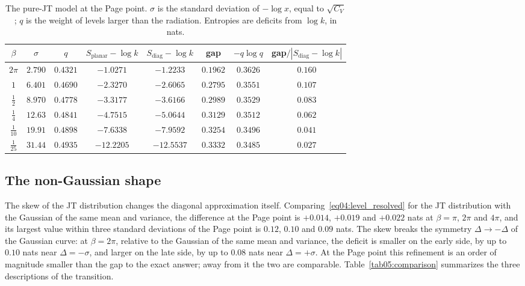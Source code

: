 \documentclass[11pt,letterpaper]{article}
\theoremstyle{plain}
\theoremstyle{definition}
\theoremstyle{remark}
\begin{document}
\begin{table}[htbp]
\centering
\caption{The pure-JT model at the Page point. $\sigma$ is the standard deviation of $-\log x$, equal to $\sqrt{C_V}$; $q$ is the weight of levels larger than the radiation. Entropies are deficits from $\log k$, in nats.}
\label{tab05:jt}
\begin{tabular}{cccccccc}
\toprule
$\beta$ & $\sigma$ & $q$ & $S_{\mathrm{planar}} - \log k$ & $S_{\mathrm{diag}} - \log k$ & gap & $-q\log q$ & gap$/|S_{\mathrm{diag}} - \log k|$ \\
\midrule
$2\pi$ & $2.790$ & $0.4321$ & $-1.0271$ & $-1.2233$ & $0.1962$ & $0.3626$ & $0.160$ \\
$1$ & $6.401$ & $0.4690$ & $-2.3270$ & $-2.6065$ & $0.2795$ & $0.3551$ & $0.107$ \\
$\tfrac12$ & $8.970$ & $0.4778$ & $-3.3177$ & $-3.6166$ & $0.2989$ & $0.3529$ & $0.083$ \\
$\tfrac14$ & $12.63$ & $0.4841$ & $-4.7515$ & $-5.0644$ & $0.3129$ & $0.3512$ & $0.062$ \\
$\tfrac1{10}$ & $19.91$ & $0.4898$ & $-7.6338$ & $-7.9592$ & $0.3254$ & $0.3496$ & $0.041$ \\
$\tfrac1{25}$ & $31.44$ & $0.4935$ & $-12.2205$ & $-12.5537$ & $0.3332$ & $0.3485$ & $0.027$ \\
\bottomrule
\end{tabular}
\end{table}

\subsection{The non-Gaussian shape}
\label{subsec05:three_layer}

The skew of the JT distribution changes the diagonal approximation itself. Comparing~\eqref{eq04:level_resolved} for the JT distribution with the Gaussian of the same mean and variance, the difference at the Page point is $+0.014$, $+0.019$ and $+0.022$ nats at $\beta = \pi$, $2\pi$ and $4\pi$, and its largest value within three standard deviations of the Page point is $0.12$, $0.10$ and $0.09$ nats. The skew breaks the symmetry $\Delta \to -\Delta$ of the Gaussian curve: at $\beta = 2\pi$, relative to the Gaussian of the same mean and variance, the deficit is smaller on the early side, by up to $0.10$ nats near $\Delta = -\sigma$, and larger on the late side, by up to $0.08$ nats near $\Delta = +\sigma$. At the Page point this refinement is an order of magnitude smaller than the gap to the exact answer; away from it the two are comparable. Table~\ref{tab05:comparison} summarizes the three descriptions of the transition.
\end{document}
